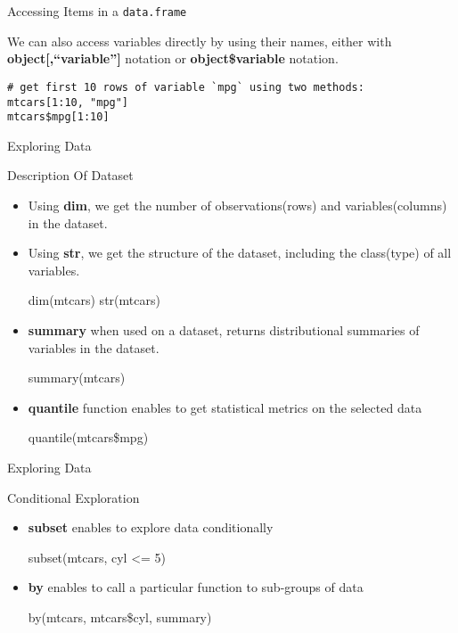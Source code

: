 \begin{frame}[fragile]{Accessing Items in a \texttt{data.frame}}

We can also access variables directly by using their names, either with
\textbf{object{[},``variable''{]}} notation or \textbf{object\$variable}
notation.

\begin{verbatim}
# get first 10 rows of variable `mpg` using two methods:
mtcars[1:10, "mpg"]
mtcars$mpg[1:10]
\end{verbatim}

\end{frame}

\begin{frame}{Exploring Data}

\begin{block}{Description Of Dataset}

\begin{itemize}
\item
  Using \textbf{dim}, we get the number of observations(rows) and
  variables(columns) in the dataset.
\item
  Using \textbf{str}, we get the structure of the dataset, including the
  class(type) of all variables.

  dim(mtcars) str(mtcars)
\item
  \textbf{summary} when used on a dataset, returns distributional
  summaries of variables in the dataset.

  summary(mtcars)
\item
  \textbf{quantile} function enables to get statistical metrics on the
  selected data

  quantile(mtcars\$mpg)
\end{itemize}

\end{block}

\end{frame}

\begin{frame}{Exploring Data}

\begin{block}{Conditional Exploration}

\begin{itemize}
\item
  \textbf{subset} enables to explore data conditionally

  subset(mtcars, cyl \textless{}= 5)
\item
  \textbf{by} enables to call a particular function to sub-groups of
  data

  by(mtcars, mtcars\$cyl, summary)
\end{itemize}

\end{block}

\end{frame}
